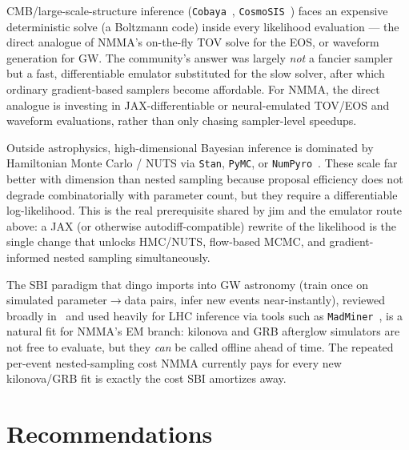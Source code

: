 \documentclass[11pt]{article}
\newcommand{\code}[1]{\texttt{#1}}
\begin{document}
\begin{description}[leftmargin=1.2em,style=nextline]
\item[Cosmology --- surrogate the slow physics, not (only) the sampler.]
CMB/large-scale-structure inference (\code{Cobaya}~\cite{Torrado:2020dgo},
\code{CosmoSIS}~\cite{Zuntz:2014csq}) faces an expensive deterministic solve (a Boltzmann
code) inside every likelihood evaluation --- the direct analogue of NMMA's on-the-fly TOV
solve for the EOS, or waveform generation for GW. The community's answer was largely
\emph{not} a fancier sampler but a fast, differentiable emulator substituted for the slow
solver, after which ordinary gradient-based samplers become affordable. For NMMA, the direct
analogue is investing in JAX-differentiable or neural-emulated TOV/EOS and waveform
evaluations, rather than only chasing sampler-level speedups.
\item[Probabilistic programming --- go gradient-based.] Outside astrophysics,
high-dimensional Bayesian inference is dominated by Hamiltonian Monte Carlo / NUTS via
\code{Stan}, \code{PyMC}, or \code{NumPyro}~\cite{Phan:2019elc}. These scale far better with
dimension than nested sampling because proposal efficiency does not degrade combinatorially
with parameter count, but they require a differentiable log-likelihood. This is the real
prerequisite shared by jim and the emulator route above: a JAX (or otherwise
autodiff-compatible) rewrite of the likelihood is the single change that unlocks HMC/NUTS,
flow-based MCMC, and gradient-informed nested sampling simultaneously.
\item[Simulation-based inference --- amortize across events.] The SBI paradigm that dingo
imports into GW astronomy (train once on simulated parameter$\to$data pairs, infer new
events near-instantly), reviewed broadly in~\cite{Cranmer:2019eaq} and used heavily for LHC
inference via tools such as \code{MadMiner}~\cite{Brehmer:2019xox}, is a natural fit for
NMMA's EM branch: kilonova and GRB afterglow simulators are not free to evaluate, but they
\emph{can} be called offline ahead of time. The repeated per-event nested-sampling cost NMMA
currently pays for every new kilonova/GRB fit is exactly the cost SBI amortizes away.
\end{description}

\section{Recommendations}
\end{document}
